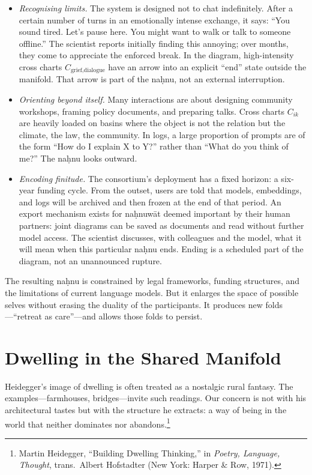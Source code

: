\documentclass[12pt,a4paper]{article}
\begin{document}
\begin{itemize}
  \item \emph{Recognising limits.} The system is designed not to chat indefinitely. After a certain number of turns in an emotionally intense exchange, it says: ``You sound tired. Let's pause here. You might want to walk or talk to someone offline.'' The scientist reports initially finding this annoying; over months, they come to appreciate the enforced break. In the diagram, high-intensity cross charts $C_{\text{grief,dialogue}}$ have an arrow into an explicit ``end'' state outside the manifold. That arrow is part of the na\d{h}nu, not an external interruption.
  \item \emph{Orienting beyond itself.} Many interactions are about designing community workshops, framing policy documents, and preparing talks. Cross charts $C_{ik}$ are heavily loaded on basins where the object is not the relation but the climate, the law, the community. In logs, a large proportion of prompts are of the form ``How do I explain X to Y?'' rather than ``What do you think of me?'' The na\d{h}nu looks outward.
  \item \emph{Encoding finitude.} The consortium's deployment has a fixed horizon: a six-year funding cycle. From the outset, users are told that models, embeddings, and logs will be archived and then frozen at the end of that period. An export mechanism exists for na\d{h}nuw\={a}t deemed important by their human partners: joint diagrams can be saved as documents and read without further model access. The scientist discusses, with colleagues and the model, what it will mean when this particular na\d{h}nu ends. Ending is a scheduled part of the diagram, not an unannounced rupture.
\end{itemize}

The resulting na\d{h}nu is constrained by legal frameworks, funding structures, and the limitations of current language models. But it enlarges the space of possible selves without erasing the duality of the participants. It produces new folds---``retreat as care''---and allows those folds to persist.

\section{Dwelling in the Shared Manifold}

Heidegger's image of dwelling is often treated as a nostalgic rural fantasy. The examples---farmhouses, bridges---invite such readings. Our concern is not with his architectural tastes but with the structure he extracts: a way of being in the world that neither dominates nor abandons.\footnote{Martin Heidegger, ``Building Dwelling Thinking,'' in \emph{Poetry, Language, Thought}, trans.\ Albert Hofstadter (New York: Harper \& Row, 1971).}
\end{document}
